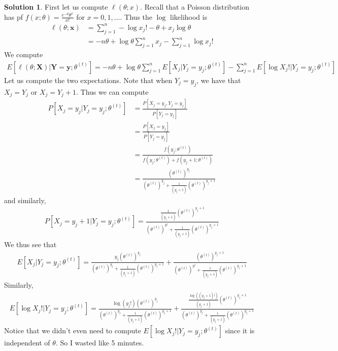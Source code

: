 \documentclass[11pt]{amsart}
\theoremstyle{definition}
\newtheorem{solution}[theorem]{Solution}
\numberwithin{equation}{section}
\begin{document}
\begin{solution}
    First let us compute $\ell(\theta;x)$. Recall that a Poisson distribution has pf $f(x;\theta)=\frac{e^{-\theta}\theta^x}{x!}$ for $x=0,1,\ldots$. Thus the $\log$ likelihood is
    \begin{align*}
        \ell(\theta;\mathbf x)&=\sum_{j=1}^n-\log x_j!-\theta+x_j\log\theta\\
        &=-n\theta+\log\theta\sum_{j=1}^nx_j-\sum_{j=1}^n\log x_j!
    \end{align*}
    We compute
    \begin{align*}
        E[\ell(\theta;\mathbf X)|\mathbf Y=\mathbf y;\theta^{(t)}]=-n\theta+\log\theta\sum_{j=1}^nE[X_j|Y_j=y_j;\theta^{(t)}]-\sum_{j=1}^nE[\log X_j!|Y_j=y_j;\theta^{(t)}]
    \end{align*}
    Let us compute the two expectations. Note that when $Y_j=y_j$, we have that $X_j=Y_j$ or $X_j=Y_j+1$. Thus we can compute
    \begin{align*}
        P[X_j=y_j|Y_j=y_j;\theta^{(t)}]&=\frac{P[X_j=y_j,Y_j=y_j]}{P[Y_j=y_j]}\\
        &=\frac{P[X_j=y_j]}{P[Y_j=y_j]}\\
        &=\frac{f(y_j;\theta^{(t)})}{f(y_j;\theta^{(t)})+f(y_j+1;\theta^{(t)})}\\
        &=\frac{(\theta^{(t)})^{y_j}}{(\theta^{(t)})^{y_j}+\frac{1}{(y_j+1)}(\theta^{(t)})^{y_j+1}}
    \end{align*}
    and similarly,
    \begin{align*}
        P[X_j=y_j+1|Y_j=y_j;\theta^{(t)}]=\frac{\frac{1}{(y_j+1)}(\theta^{(t)})^{y_j+1}}{(\theta^{(t)})^{y^j}+\frac{1}{(y_j+1)}(\theta^{(t)})^{y_j+1}}
    \end{align*}
    We thus see that
    \begin{align*}
        E[X_j|Y_j=y_j;\theta^{(t)}]=\frac{y_j(\theta^{(t)})^{y_j}}{(\theta^{(t)})^{y_j}+\frac{1}{(y_j+1)}(\theta^{(t)})^{y_j+1}}+\frac{(\theta^{(t)})^{y_j+1}}{(\theta^{(t)})^{y^j}+\frac{1}{(y_j+1)}(\theta^{(t)})^{y_j+1}}
    \end{align*}
    Similarly,
    \begin{align*}
        E[\log X_j!|Y_j=y_j;\theta^{(t)}]=\frac{\log(y_j!)(\theta^{(t)})^{y_j}}{(\theta^{(t)})^{y_j}+\frac1{(y_j+1)}(\theta^{(t)})^{y_j+1}}+\frac{\frac{\log((y_j+1)!)}{(y_j+1)}(\theta^{(t)})^{y_j+1}}{(\theta^{(t)})^{y_j}+\frac1{(y_j+1)}(\theta^{(t)})^{y_j+1}}
    \end{align*}
    Notice that we didn't even need to compute $E[\log X_j!|Y_j=y_j;\theta^{(t)}]$ since it is independent of $\theta$. So I wasted like 5 minutes.


\end{solution}
\end{document}
